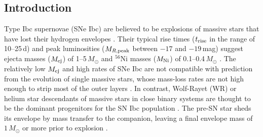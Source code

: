 \documentclass[twocolumn]{aastex63}
\begin{document}
\begin{CJK*}{UTF8}{gbsn}
\begin{abstract}
\end{abstract}



\vspace{1em}

\section{Introduction}
Type Ibc supernovae (SNe Ibc) are believed to be explosions of massive stars that have lost their 
hydrogen envelopes \citep{Filippenko1997, GalYam2017}. Their typical rise times ($t_{\rm rise}$ in the 
range of 10--25\,d) and peak luminosities ($M_{R\rm , peak}$ between $-17$ and $-19$\,mag) 
suggest ejecta masses ($M_{\rm ej}$) of 1--5\,$M_\odot$ and $^{56}$Ni masses ($M_{\rm Ni}$) of 
0.1--0.4\,$M_\odot$ \citep{Drout2011, Taddia2018, Prentice2019}. The relatively low $M_{\rm ej}$ and 
high rates of SNe Ibc are not compatible with prediction from the evolution of single massive stars, 
whose mass-loss rates are not high enough to strip most of the outer layers \citep{Smith2011, 
Lyman2016}. In contrast, Wolf-Rayet (WR) or helium star descendants of massive stars in close binary 
systems are thought to be the dominant progenitors for the SN Ibc population \citep{Dessart2012, 
Eldridge2013}. The pre-SN star sheds its envelope by mass transfer to the companion, leaving a final 
envelope mass of $1\,M_\odot$ or more prior to explosion \citep{Yoon2010}.


\end{CJK*}
\end{document}

